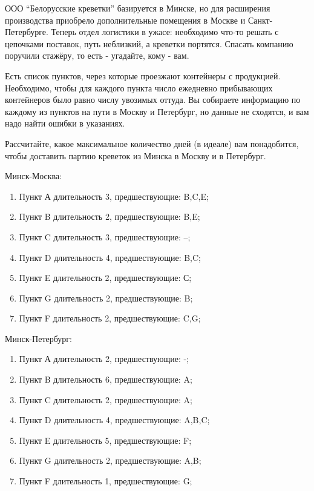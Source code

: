 \question
ООО “Белорусские креветки” базируется в Минске, но для расширения производства приобрело дополнительные помещения в Москве и Санкт-Петербурге. Теперь отдел логистики в ужасе: необходимо что-то решать с цепочками поставок, путь неблизкий, а креветки портятся. Спасать компанию поручили стажёру, то есть - угадайте, кому - вам.

Есть список пунктов, через которые проезжают контейнеры с продукцией. Необходимо, чтобы для каждого пункта число ежедневно прибывающих контейнеров было равно числу увозимых оттуда. Вы собираете информацию по каждому из пунктов на пути в Москву и Петербург, но данные не сходятся, и вам надо найти ошибки в указаниях.

Рассчитайте, какое максимальное количество дней (в идеале) вам понадобится, чтобы доставить партию креветок из Минска в Москву и в Петербург.


Минск-Москва:
\begin{enumerate}
\item Пункт А длительность 3, предшествующие: B,C,E;
\item Пункт B длительность 2, предшествующие: B,E;
\item Пункт C длительность 3, предшествующие: –;
\item Пункт D длительность 4, предшествующие: B,C;
\item Пункт E длительность 2, предшествующие: С;
\item Пункт G длительность 2, предшествующие: B;
\item Пункт F длительность 2, предшествующие: C,G;
\end{enumerate}
Минск-Петербург:
\begin{enumerate}
\item Пункт А длительность 2, предшествующие: -;
\item Пункт B длительность 6, предшествующие: A;
\item Пункт C длительность 2, предшествующие: A;
\item Пункт D длительность 4, предшествующие: A,B,C;
\item Пункт E длительность 5, предшествующие: F;
\item Пункт G длительность 2, предшествующие: A,B;
\item Пункт F длительность 1, предшествующие: G;
\end{enumerate}
